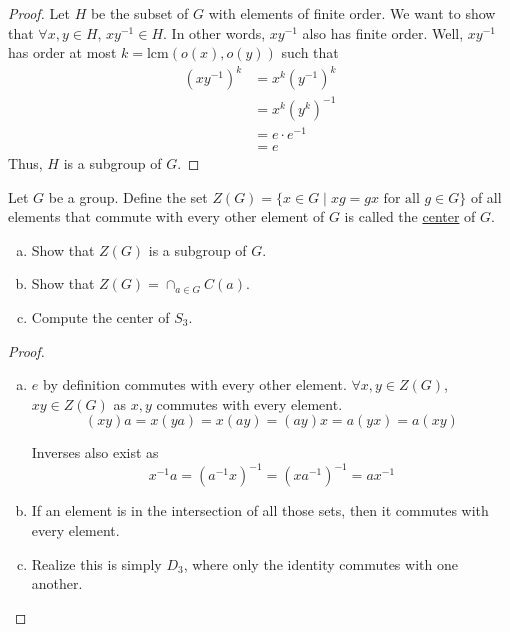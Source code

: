 \begin{proof}
Let $H$ be the subset of $G$ with elements of finite order. We want to show that $\forall x, y\in H$, $xy^{-1}\in H$. In other words, $xy^{-1}$ also has finite order. Well, $xy^{-1}$ has order at most $k=\mathrm{lcm}(o(x), o(y))$ such that 
\begin{align*}
	(xy^{-1})^k &= x^k (y^{-1})^k \\
	&= x^k (y^k)^{-1} \\
	&= e\cdot e^{-1} \\
	&= e
\end{align*}
Thus, $H$ is a subgroup of $G$. 
\end{proof}

\exercise
Let $G$ be a group. Define the set $Z(G)=\{x\in G\mid xg=gx\text{ for all }g\in G\}$ of all elements that commute with every other element of $G$ is called the \ul{center} of $G$. 
\begin{enumerate}[(a)]
\item Show that $Z(G)$ is a subgroup of $G$. 
\item Show that $Z(G) = \cap_{a\in G}C(a)$. 
\item Compute the center of $S_3$. 
\end{enumerate}

\begin{proof}
\begin{enumerate}[(a)]
\item $e$ by definition commutes with every other element. $\forall x, y\in Z(G)$, $xy\in Z(G)$ as $x,y$ commutes with every element. 
\[(xy)a = x(ya) = x(ay) = (ay)x = a(yx) = a(xy)\]

Inverses also exist as
\[x^{-1}a = (a^{-1}x)^{-1} = (xa^{-1})^{-1} = ax^{-1}\]

\item If an element is in the intersection of all those sets, then it commutes with every element. 
\item Realize this is simply $D_3$, where only the identity commutes with one another. 
\end{enumerate}
	
\end{proof}


